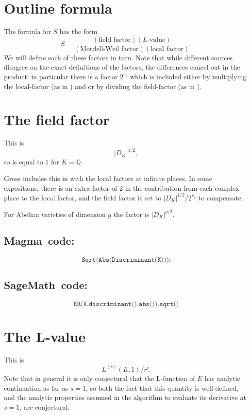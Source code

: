 \documentclass{amsart}
\newcommand{\software}[1]{\textsf{#1}} %
\newcommand{\Sage}{\software{SageMath}}
\newcommand{\Magma}{\software{Magma}{}}
\newcommand\Q{\mathbb{Q}}
\begin{document}
\section{Outline formula}\label{outline-formula}

The formula for \(S\) has the form
\[
S = \frac{(\text{field~factor})(\text{$L$-value})}{(\text{Mordell-Weil factor})(\text{local~factor})}.
\]
We will define each of these factors in turn.  Note that while
different sources disagree on the exact definitions of the factors,
the differences cancel out in the product: in particular there is a
factor $2^{r_2}$ which is included either by multiplying the
local-factor (as in \cite{Dok}) and or by dividing the field-factor
(as in \cite{Tate}).

\section{The field factor}\label{field-factor}

This is \[|D_K|^{1/2},\] so is equal to \(1\) for \(K=\Q\).

Gross includes this in with the local factors at infinite places.  In
some expositions, there is an extra factor of $2$ in the contribution
from each complex place to the local factor, and the field factor is
set to \(|D_K|^{1/2}/2^{r_2}\) to compensate.

For Abelian varieties of dimension \(g\) the factor is
\(|D_K|^{g/2}\).

\subsection{\Magma\ code:}\label{magma-1}

\[
\texttt{Sqrt(Abs(Discriminant(K)));}
\]

\subsection{\Sage\ code:}\label{sage-1}

\[
\texttt{RR(K.discriminant().abs()).sqrt()}
\]

\section{The L-value}\label{the-l-value}

This is \[L^{(r)}(E,1)/r!.\] Note that in general it is only conjectural
that the L-function of \(E\) has analytic continuation as far as
\(s=1\), so both the fact that this quantity is well-defined, and the
analytic properties assumed in the algorithm to evaluate its derivative
at \(s=1\), are conjectural.
\end{document}
